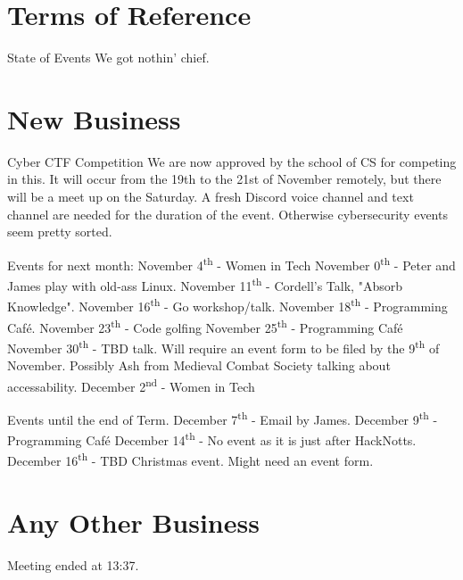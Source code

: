 \documentclass[11pt,hacksoc]{meetingmins}
\begin{document}
\maketitle

\section{Terms of Reference}
\begin{items}

  \item {State of Events}
  \subitem We got nothin' chief.

\end{items}

\section{New Business}
\begin{items}

  \item Cyber CTF Competition
  \subitem We are now approved by the school of CS for competing in this.
  \subitem It will occur from the 19th to the 21st of November remotely, but there will be a meet up on the Saturday.
  \subitem A fresh Discord voice channel and text channel are needed for the duration of the event.
  \subitem Otherwise cybersecurity events seem pretty sorted.

  \item Events for next month:
  \subitem November 4\textsuperscript{th} - Women in Tech
  \subitem November 0\textsuperscript{th} - Peter and James play with old-ass Linux.
  \subitem November 11\textsuperscript{th} - Cordell's Talk, "Absorb Knowledge".
  \subitem November 16\textsuperscript{th} - Go workshop/talk.
  \subitem November 18\textsuperscript{th} - Programming Café.
  \subitem November 23\textsuperscript{th} - Code golfing
  \subitem November 25\textsuperscript{th} - Programming Café
  \subitem November 30\textsuperscript{th} - TBD talk.
  \subsubitem Will require an event form to be filed by the 9\textsuperscript{th} of November.
  \subsubitem Possibly Ash from Medieval Combat Society talking about accessability.
  \subitem December 2\textsuperscript{nd} - Women in Tech

  \item Events until the end of Term.
  \subitem December 7\textsuperscript{th} - Email by James.
  \subitem December 9\textsuperscript{th} - Programming Café
  \subitem December 14\textsuperscript{th} - No event as it is just after HackNotts.
  \subitem December 16\textsuperscript{th} - TBD Christmas event.
  \subsubitem Might need an event form.

\end{items}

\section{Any Other Business}

Meeting ended at 13:37.

\vspace{1em}
\end{document}
